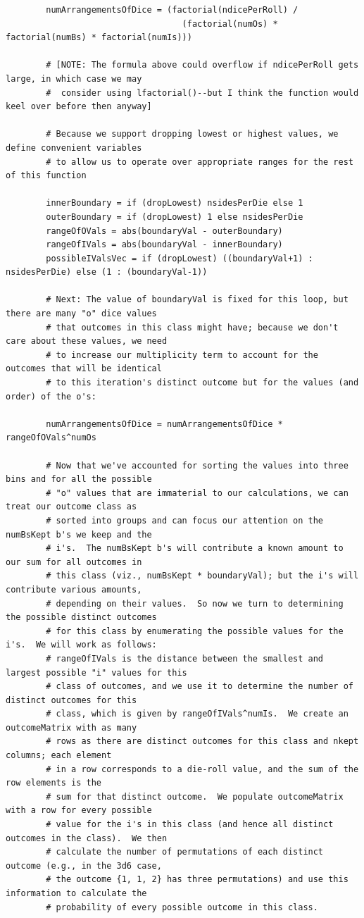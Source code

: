 \documentclass[12pt]{article}
\begin{document}
\begin{lstlisting}
        numArrangementsOfDice = (factorial(ndicePerRoll) / 
                                   (factorial(numOs) * factorial(numBs) * factorial(numIs)))
        
        # [NOTE: The formula above could overflow if ndicePerRoll gets large, in which case we may
        #  consider using lfactorial()--but I think the function would keel over before then anyway]
        
        # Because we support dropping lowest or highest values, we define convenient variables
        # to allow us to operate over appropriate ranges for the rest of this function
        
        innerBoundary = if (dropLowest) nsidesPerDie else 1
        outerBoundary = if (dropLowest) 1 else nsidesPerDie
        rangeOfOVals = abs(boundaryVal - outerBoundary)
        rangeOfIVals = abs(boundaryVal - innerBoundary)
        possibleIValsVec = if (dropLowest) ((boundaryVal+1) : nsidesPerDie) else (1 : (boundaryVal-1))
        
        # Next: The value of boundaryVal is fixed for this loop, but there are many "o" dice values
        # that outcomes in this class might have; because we don't care about these values, we need
        # to increase our multiplicity term to account for the outcomes that will be identical 
        # to this iteration's distinct outcome but for the values (and order) of the o's:
        
        numArrangementsOfDice = numArrangementsOfDice * rangeOfOVals^numOs
        
        # Now that we've accounted for sorting the values into three bins and for all the possible
        # "o" values that are immaterial to our calculations, we can treat our outcome class as
        # sorted into groups and can focus our attention on the numBsKept b's we keep and the 
        # i's.  The numBsKept b's will contribute a known amount to our sum for all outcomes in 
        # this class (viz., numBsKept * boundaryVal); but the i's will contribute various amounts, 
        # depending on their values.  So now we turn to determining the possible distinct outcomes 
        # for this class by enumerating the possible values for the i's.  We will work as follows:
        # rangeOfIVals is the distance between the smallest and largest possible "i" values for this
        # class of outcomes, and we use it to determine the number of distinct outcomes for this
        # class, which is given by rangeOfIVals^numIs.  We create an outcomeMatrix with as many
        # rows as there are distinct outcomes for this class and nkept columns; each element
        # in a row corresponds to a die-roll value, and the sum of the row elements is the
        # sum for that distinct outcome.  We populate outcomeMatrix with a row for every possible 
        # value for the i's in this class (and hence all distinct outcomes in the class).  We then
        # calculate the number of permutations of each distinct outcome (e.g., in the 3d6 case,
        # the outcome {1, 1, 2} has three permutations) and use this information to calculate the 
        # probability of every possible outcome in this class.
        

\end{lstlisting}
\end{document}
